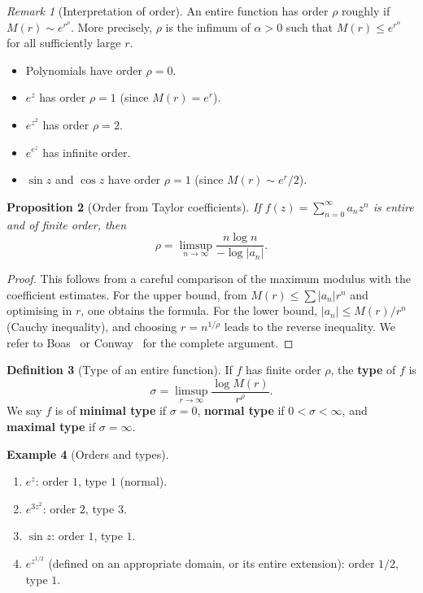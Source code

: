 \documentclass[12pt,a4paper,openany]{book}
\theoremstyle{definition}
\newtheorem{definition}{Definition}[chapter]
\newtheorem{example}[definition]{Example}
\theoremstyle{plain}
\newtheorem{proposition}[definition]{Proposition}
\theoremstyle{remark}
\newtheorem{remark}[definition]{Remark}
\newcommand{\abs}[1]{\left|#1\right|}
\begin{document}
\begin{remark}[Interpretation of order]\label{rem:order-interpretation}
An entire function has order $\rho$ roughly if $M(r) \sim e^{r^\rho}$.
More precisely, $\rho$ is the infimum of $\alpha > 0$ such that
$M(r) \leq e^{r^\alpha}$ for all sufficiently large $r$.
\begin{itemize}
  \item Polynomials have order $\rho = 0$.
  \item $e^z$ has order $\rho = 1$ (since $M(r) = e^r$).
  \item $e^{z^2}$ has order $\rho = 2$.
  \item $e^{e^z}$ has infinite order.
  \item $\sin z$ and $\cos z$ have order $\rho = 1$
    (since $M(r) \sim e^r/2$).
\end{itemize}
\end{remark}

\begin{proposition}[Order from Taylor coefficients]\label{prop:order-coefficients}
If $f(z) = \sum_{n=0}^{\infty} a_n z^n$ is entire and of finite order, then
\[
  \rho = \limsup_{n \to \infty} \frac{n \log n}{-\log \abs{a_n}}.
\]
\end{proposition}

\begin{proof}
This follows from a careful comparison of the maximum modulus with the
coefficient estimates. For the upper bound, from $M(r) \leq \sum \abs{a_n}r^n$
and optimising in $r$, one obtains the formula. For the lower bound,
$\abs{a_n} \leq M(r)/r^n$ (Cauchy inequality), and choosing
$r = n^{1/\rho}$ leads to the reverse inequality. We refer to
Boas~\cite{boas1954} or Conway~\cite{conway1978} for the complete argument.
\end{proof}

\begin{definition}[Type of an entire function]\label{def:type-entire}
If $f$ has finite order $\rho$, the \textbf{type} of $f$ is
\[
  \sigma = \limsup_{r \to \infty} \frac{\log M(r)}{r^\rho}.
\]
We say $f$ is of \textbf{minimal type} if $\sigma = 0$, \textbf{normal type}
if $0 < \sigma < \infty$, and \textbf{maximal type} if $\sigma = \infty$.
\end{definition}

\begin{example}[Orders and types]\label{ex:order-type}
\begin{enumerate}[label=(\roman*)]
  \item $e^z$: order $1$, type $1$ (normal).
  \item $e^{3z^2}$: order $2$, type $3$.
  \item $\sin z$: order $1$, type $1$.
  \item $e^{z^{1/2}}$ (defined on an appropriate domain, or
    its entire extension): order $1/2$, type $1$.
\end{enumerate}
\end{example}
\end{document}
